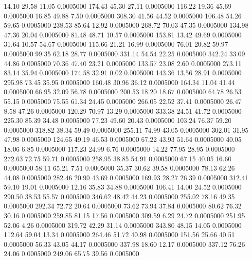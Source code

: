   14.10   29.58   11.05   0.0005000
 174.43   45.30   27.11   0.0005000
 116.22   19.36   45.69   0.0005000
  16.85   49.88    7.50   0.0005000
 308.30   41.56   44.52   0.0005000
 106.48   54.26   59.65   0.0005000
 238.53   85.64   12.92   0.0005000
 268.72   70.03   47.35   0.0005000
 134.98   47.36   20.04   0.0005000
  81.48   48.71   10.57   0.0005000
 153.81   13.42   49.69   0.0005000
  31.64   10.57   54.67   0.0005000
 115.66   21.21   16.99   0.0005000
  76.01   20.82   59.97   0.0005000
  99.35   62.18   28.77   0.0005000
 331.14   54.54   22.25   0.0005000
 342.24   33.09   44.86   0.0005000
  70.36   47.40   23.21   0.0005000
 133.57   23.08    2.60   0.0005000
 273.11   83.14   35.94   0.0005000
 174.58   32.91    0.02   0.0005000
 143.36   13.56   28.91   0.0005000
 295.98   73.45   35.95   0.0005000
 160.48   30.96   36.12   0.0005000
 164.34   11.04   41.44   0.0005000
  66.95   32.09   56.78   0.0005000
 200.53   18.20   18.67   0.0005000
  64.78   26.53   55.15   0.0005000
  75.55   61.34   24.45   0.0005000
 266.05   22.52   37.41   0.0005000
  26.47    8.58   47.26   0.0005000
 120.29   70.97   13.29   0.0005000
 333.38   24.51   41.72   0.0005000
 225.30   85.39   34.48   0.0005000
  77.23   49.60   20.43   0.0005000
 103.24   76.37   59.20   0.0005000
 318.82   38.34   59.49   0.0005000
 255.11   74.99   43.05   0.0005000
 302.01   31.95   47.98   0.0005000
 124.65   49.19   46.53   0.0005000
  67.22   43.93   51.64   0.0005000
  40.05   18.06    6.85   0.0005000
 117.23   24.99    6.76   0.0005000
  14.22   77.95   28.95   0.0005000
 272.63   72.75   59.71   0.0005000
 258.95   38.85   54.91   0.0005000
  67.15   40.05   16.60   0.0005000
  58.11   65.21    7.51   0.0005000
  35.37   30.62   39.58   0.0005000
  78.13   62.26   44.08   0.0005000
 282.46   20.90   43.69   0.0005000
 169.93   28.27   26.39   0.0005000
 312.41   59.10   19.01   0.0005000
  12.16   35.83   34.88   0.0005000
 106.41   14.00   24.52   0.0005000
 290.50   38.53   55.57   0.0005000
 346.62   48.42   44.23   0.0005000
 255.02   78.16   49.35   0.0005000
 292.34   72.72   20.64   0.0005000
  73.62   73.94   37.84   0.0005000
  80.62   76.32   30.16   0.0005000
 259.85   81.15   17.56   0.0005000
 309.59    6.29   24.72   0.0005000
 251.95   52.06    4.26   0.0005000
 319.72   42.29   31.14   0.0005000
 343.80   48.15   14.05   0.0005000
 112.64   59.04   13.34   0.0005000
 264.46   51.72   40.98   0.0005000
 151.56   25.66   40.51   0.0005000
  56.33   43.05   44.17   0.0005000
 337.98   18.60   12.17   0.0005000
 337.12   76.26   24.06   0.0005000
 249.06   65.75   39.56   0.0005000
